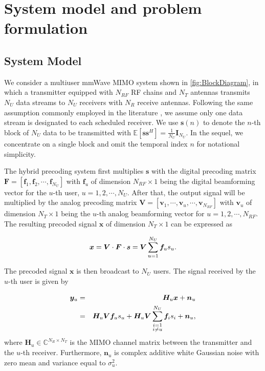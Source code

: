 \documentclass[10pt,journal,twocolumn,twoside]{IEEEtran}
\begin{document}
\section{System model and problem formulation}\label{system}



\subsection{System Model}

We consider a multiuser mmWave MIMO system shown in \figurename{ \ref{fig:BlockDiagram}}, in which a transmitter equipped with $N_{RF}$ RF chains and $N_T$ antennas transmits $N_U$ data streams to $N_U$ receivers with $N_R$ receive antennas. Following the same assumption commonly employed in the literature \cite{alkhateeb2015limited}, we assume only one data stream is designated to each scheduled receiver. We use ${\bm s}(n)$ to denote the $n$-th block of $N_U$ data to be transmitted with $\mathbb{E}\left[\bm{ss}^H\right]=\frac{1}{N_U}\bm{I}_{N_U}$. In the sequel, we concentrate on a single block and omit the temporal index $n$ for notational simplicity.


The hybrid precoding system first multiplies ${\bm s}$ with the digital precoding matrix $\bm{F}=\left[{\bm f}_1,{\bm f}_2,\cdots, {\bm f}_{N_U}\right]$ with ${\bm f}_u$ of dimension $N_{RF}\times 1$ being the digital beamforming vector for the $u$-th user, $u=1,2,\cdots,N_U$. After that, the output signal will be multiplied by the analog precoding matrix $\bm{V}=\left[{\bm v}_1,\cdots,{\bm v}_u,\cdots,{\bm v}_{N_{RF}}\right]$ with ${\bm v}_u$ of dimension $N_T\times 1$ being the $u$-th analog beamforming vector for $u = 1,2,\cdots,N_{RF}$. The resulting precoded signal $\bm x$ of dimension $N_T\times 1$  can be expressed as

\begin{equation}{\label{eq:transx1}}
{\bm x} = \bm{V}\cdot \bm{F}\cdot\bm{s}= \bm{V}\sum_{u=1}^{N_U}\bm{f}_u s_u.
\end{equation}

The precoded signal $\bm x$ is then broadcast to $N_U$ users. The signal received by the $u$-th user is given by

\begin{eqnarray}{\label{eq:transx2}}
{\bm y}_u &=& \bm{H}_u \bm{x} + \bm{n}_u\\
&=&\bm{H}_u \bm{V}\bm{f}_us_u+\bm{H}_u \bm{V}\sum_{\substack{i=1 \\ i\neq u}}^{N_U}\bm{f}_is_i+\bm{n}_u,
\end{eqnarray}
where $\bm{H}_u$$\in\mathbb{C}^{N_R\times N_T}$ is the MIMO channel matrix between the transmitter and the $u$-th receiver\cite{el2014spatially}. Furthermore, $\bm{n}_u$ is complex additive white Gaussian noise with zero mean and variance equal to $\sigma_u^2$.
\end{document}
